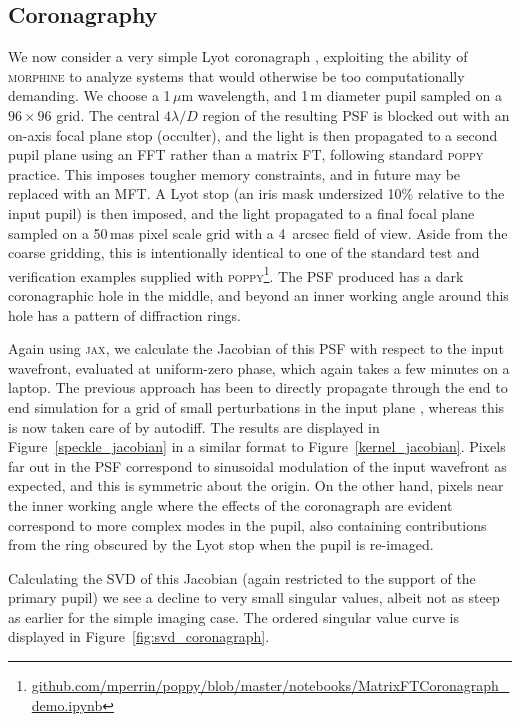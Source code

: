 \documentclass[modern]{aastex63}
\begin{document}
\subsection{Coronagraphy}
\label{sec:coronagraph}

We now consider a very simple Lyot coronagraph \citep{lyot30}, exploiting the ability of \textsc{morphine} to analyze systems that would otherwise be too computationally demanding. We choose a 1\,$\mu$m wavelength, and 1\,m diameter pupil sampled on a $96\times96$ grid. The central $4 \lambda/D$ region of the resulting PSF is blocked out with an on-axis focal plane stop (occulter), and the light is then propagated to a second pupil plane using an FFT rather than a matrix FT, following standard \textsc{poppy} practice. This imposes tougher memory constraints, and in future may be replaced with an MFT. A Lyot stop (an iris mask undersized 10\% relative to the input pupil) is then imposed, and the light propagated to a final focal plane sampled on a 50\,mas pixel scale grid with a 4~arcsec field of view. Aside from the coarse gridding, this is intentionally identical to one of the standard test and verification examples supplied with \textsc{poppy}\footnote{\href{https://github.com/mperrin/poppy/blob/master/notebooks/MatrixFTCoronagraph_demo.ipynb}{github.com/mperrin/poppy/blob/master/notebooks/MatrixFTCoronagraph\_demo.ipynb}}. The PSF produced has a dark coronagraphic hole in the middle, and beyond an inner working angle around this hole has a pattern of diffraction rings.

Again using \textsc{jax}, we calculate the Jacobian of this PSF with respect to the input wavefront, evaluated at uniform-zero phase, which again takes a few minutes on a laptop. The previous approach has been to directly propagate through the end to end simulation for a grid of small perturbations in the input plane \citep{falco}, whereas this is now taken care of by autodiff. The results are displayed in Figure~\ref{speckle_jacobian} in a similar format to Figure~\ref{kernel_jacobian}. Pixels far out in the PSF correspond to sinusoidal modulation of the input wavefront as expected, and this is symmetric about the origin. On the other hand, pixels near the inner working angle where the effects of the coronagraph are evident correspond to more complex modes in the pupil, also containing contributions from the ring obscured by the Lyot stop when the pupil is re-imaged. 

Calculating the SVD of this Jacobian (again restricted to the support of the primary pupil) we see a decline to very small singular values, albeit not as steep as earlier for the simple imaging case. The ordered singular value curve is displayed in Figure~\ref{fig:svd_coronagraph}. 
\end{document}
